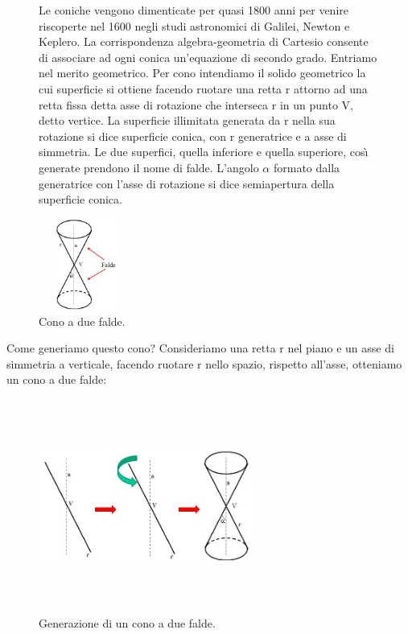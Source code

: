 \begin{figure}[htbp]
  \begin{minipage}{.75\textwidth}
Le coniche vengono dimenticate per quasi 1800 anni per 
venire riscoperte nel 1600 negli studi astronomici di Galilei, Newton e 
Keplero. La corrispondenza algebra-geometria di Cartesio consente di 
associare ad ogni conica un'equazione di secondo grado.
Entriamo nel merito geometrico. Per cono intendiamo il 
solido geometrico la cui superficie si ottiene facendo ruotare una retta r 
attorno ad una retta fissa detta asse di rotazione  che interseca r in un 
punto V, detto vertice. La superficie illimitata generata da r nella sua 
rotazione si dice superficie conica, con r generatrice e a asse di 
simmetria. Le due superfici, quella inferiore e quella superiore, cos\`{\i} 
generate prendono il nome di falde. L'angolo $ \alpha $ formato dalla 
generatrice con l'asse di rotazione si dice semiapertura della superficie 
conica.
  \end{minipage}
  \hspace{.5cm}
  \begin{minipage}{.20\textwidth}
  \begin{inaccessibleblock}
\includegraphics[height=3cm, width=3cm]{img/conoaduefalde.jpg}
    \caption{Cono a due falde.} 
\label{fig:conoaduefalde}
    \end{inaccessibleblock}
  \end{minipage}
\end{figure}
  
Come generiamo questo cono? Consideriamo una retta r nel piano e un asse di 
simmetria a verticale, facendo ruotare r  nello spazio, rispetto all'asse, 
otteniamo un cono a due falde:
\begin{figure}[htbp]
  \begin{inaccessibleblock}
    \centering%
\includegraphics[height=7cm, width=7cm, keepaspectratio]{img/rotazionecono2.jpg}
    \caption{Generazione di un cono a due falde.}%
  \end{inaccessibleblock}
\end{figure}

